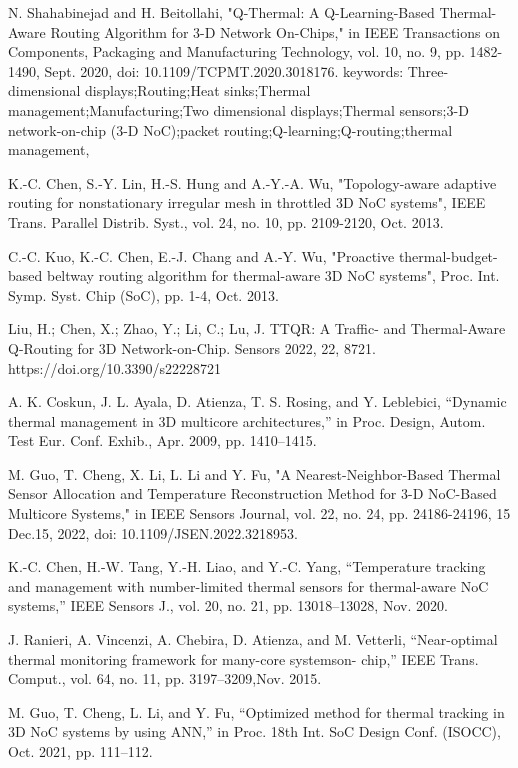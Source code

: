 \documentclass[conference]{IEEEtran}
\begin{document}
\begin{thebibliography}{00}

N. Shahabinejad and H. Beitollahi, "Q-Thermal: A Q-Learning-Based Thermal-Aware Routing Algorithm for 3-D Network On-Chips," in IEEE Transactions on Components, Packaging and Manufacturing Technology, vol. 10, no. 9, pp. 1482-1490, Sept. 2020, doi: 10.1109/TCPMT.2020.3018176. keywords: {Three-dimensional displays;Routing;Heat sinks;Thermal management;Manufacturing;Two dimensional displays;Thermal sensors;3-D network-on-chip (3-D NoC);packet routing;Q-learning;Q-routing;thermal management},

K.-C. Chen, S.-Y. Lin, H.-S. Hung and A.-Y.-A. Wu, "Topology-aware adaptive routing for nonstationary irregular mesh in throttled 3D NoC systems", IEEE Trans. Parallel Distrib. Syst., vol. 24, no. 10, pp. 2109-2120, Oct. 2013.

C.-C. Kuo, K.-C. Chen, E.-J. Chang and A.-Y. Wu, "Proactive thermal-budget-based beltway routing algorithm for thermal-aware 3D NoC systems", Proc. Int. Symp. Syst. Chip (SoC), pp. 1-4, Oct. 2013.

Liu, H.; Chen, X.; Zhao, Y.; Li, C.; Lu, J. TTQR: A Traffic- and Thermal-Aware Q-Routing for 3D Network-on-Chip. Sensors 2022, 22, 8721. https://doi.org/10.3390/s22228721

A. K. Coskun, J. L. Ayala, D. Atienza, T. S. Rosing, and Y. Leblebici, “Dynamic thermal management in 3D multicore architectures,” in Proc.
Design, Autom. Test Eur. Conf. Exhib., Apr. 2009, pp. 1410–1415.

M. Guo, T. Cheng, X. Li, L. Li and Y. Fu, "A Nearest-Neighbor-Based Thermal Sensor Allocation and Temperature Reconstruction Method for 3-D NoC-Based Multicore Systems," in IEEE Sensors Journal, vol. 22, no. 24, pp. 24186-24196, 15 Dec.15, 2022, doi: 10.1109/JSEN.2022.3218953.

K.-C. Chen, H.-W. Tang, Y.-H. Liao, and Y.-C. Yang, “Temperature tracking and management with number-limited thermal sensors
for thermal-aware NoC systems,” IEEE Sensors J., vol. 20, no. 21, pp. 13018–13028, Nov. 2020.

J. Ranieri, A. Vincenzi, A. Chebira, D. Atienza, and M. Vetterli, “Near-optimal thermal monitoring framework for many-core systemson-
chip,” IEEE Trans. Comput., vol. 64, no. 11, pp. 3197–3209,Nov. 2015.

M. Guo, T. Cheng, L. Li, and Y. Fu, “Optimized method for thermal tracking in 3D NoC systems by using ANN,” in Proc. 18th Int. SoC
Design Conf. (ISOCC), Oct. 2021, pp. 111–112.


\end{thebibliography}
\end{document}
